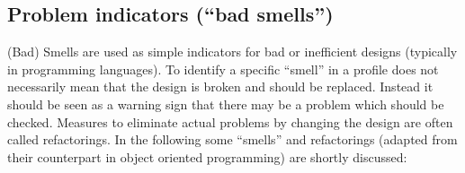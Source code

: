 \subsection{Problem indicators (``bad
smells'')} \label{modelling-bad-smells}


(Bad) Smells are used as simple indicators for bad or inefficient designs (typically in programming languages). To identify a specific ``smell'' in a profile does not necessarily mean that the design is broken and should be replaced. Instead it should be seen as a warning sign that there may be a problem which should be checked. Measures to eliminate actual problems by changing the design are often called refactorings. In the following some ``smells'' and refactorings (adapted from their counterpart in object oriented programming) are shortly discussed:


